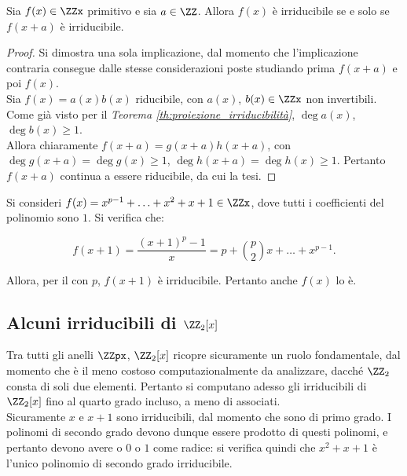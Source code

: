 \begin{theorem}
    Sia $f(x) \in \ZZx$ primitivo e sia $a \in \ZZ$. Allora $f(x)$ è
    irriducibile se e solo se $f(x+a)$ è irriducibile.
\end{theorem}

\begin{proof}
    Si dimostra una sola implicazione, dal momento che l'implicazione
    contraria consegue dalle stesse considerazioni poste
    studiando prima $f(x+a)$ e poi $f(x)$. \\

    Sia $f(x)=a(x)b(x)$ riducibile, con $a(x)$, $b(x) \in \ZZx$ non
    invertibili. Come già visto per il \textit{Teorema
        \ref{th:proiezione_irriducibilità}}, $\deg a(x)$, $\deg b(x) \geq 1$. \\

    Allora chiaramente $f(x+a)=g(x+a)h(x+a)$, con $\deg g(x+a) =
        \deg g(x) \geq 1$, $\deg h(x+a) = \deg h(x) \geq 1$. Pertanto
    $f(x+a)$ continua a essere riducibile, da cui la tesi.
\end{proof}

\begin{example}
    Si consideri $f(x) = x^{p-1}+\ldots+x^2+x+1 \in \ZZx$, dove
    tutti i coefficienti del polinomio sono $1$. Si verifica che:

    \[ f(x+1)=\frac{(x+1)^p-1}x = p+\binom{p}{2}x+\ldots+x^{p-1}. \]

    Allora, per il  con $p$, $f(x+1)$ è
    irriducibile. Pertanto anche $f(x)$ lo è.
\end{example}

\subsection{Alcuni irriducibili di \texorpdfstring{$\ZZ_2[x]$}{Z\_2[x]}}

Tra tutti gli anelli $\ZZpx$, $\ZZ_2[x]$ ricopre sicuramente
un ruolo fondamentale, dal momento che è il meno costoso
computazionalmente da analizzare, dacché $\ZZ_2$ consta
di soli due elementi. Pertanto si computano adesso gli
irriducibili di $\ZZ_2[x]$ fino al quarto grado incluso, a meno
di associati. \\

Sicuramente $x$ e $x+1$ sono irriducibili, dal momento che sono di
primo grado. I polinomi di secondo grado devono dunque essere
prodotto di questi polinomi, e pertanto devono avere o $0$ o
$1$ come radice: si verifica quindi che $x^2+x+1$ è l'unico
polinomio di secondo grado irriducibile. \\

